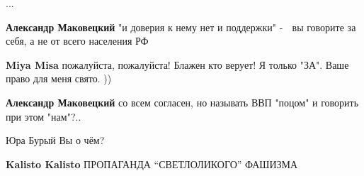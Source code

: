 \begin{itemize}
\begin{itemize}
{...
}

 
\textbf{Александр Маковецкий} "и доверия к нему нет и поддержки" - 🤔 вы говорите за себя, а не от всего населения РФ

 
\textbf{Miya Misa} пожалуйста, пожалуйста! Блажен кто верует! Я только "ЗА". Ваше право для меня свято. ))

 
\textbf{Александр Маковецкий} со всем согласен, но называть ВВП "поцом" и говорить при этом "нам"?..

 
Юра Бурый Вы о чём?

 
\textbf{Kalisto Kalisto} ПРОПАГАНДА \enquote{СВЕТЛОЛИКОГО} ФАШИЗМА

\end{itemize}

\end{itemize}

